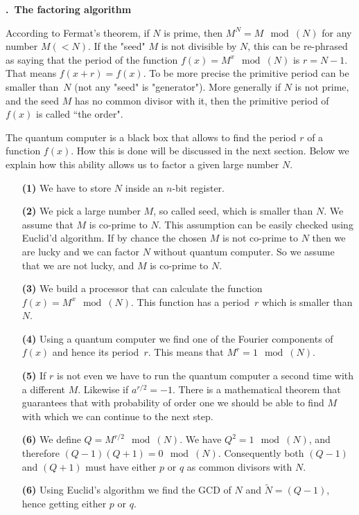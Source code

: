 \documentclass[onecolumn,fleqn, 11pt]{revtex4}
\renewcommand{\thesubsection}{\arabic{subsection}}
\renewcommand{\thesubsubsection}{\arabic{subsubsection}}
\newcommand{\sheadC}[1]
{
\addtocounter{subsubsection}{1}
\vspace{5mm}
{\bf \thesubsection.\thesubsubsection \ #1}  
\nopagebreak
\phantomsection
}
\begin{document}
\sheadC{The factoring algorithm}


According to Fermat's  theorem, if $N$ is prime, 
then $M^N=M \mod(N)$ for any number $M (<N)$.
If the "seed" $M$ is not divisible by $N$, 
this can be re-phrased as saying that the period  
of the function $f(x)=M^x \mod(N)$ is $r=N{-}1$.
That means ${f(x+r)=f(x)}$. 
To be more precise the primitive period can be smaller 
than~$N$ (not any "seed" is "generator"). 
More generally if $N$ is not prime, 
and the seed $M$ has no common divisor with it, 
then the primitive period of $f(x)$ 
is called ``the order".


The quantum computer is a black box that allows 
to find the period $r$ of a function $f(x)$. 
How this is done will be discussed in the 
next section. Below we explain how this ability 
allows us to factor a given large number $N$. 
\begin{itemize}
\item[{\bf (1)}] 
We have to store $N$ inside an $n$-bit register. 
\item[{\bf (2)}] 
We pick a large number $M$, so called seed, which is smaller than $N$. 
We assume that $M$ is co-prime to $N$. This assumption can be 
easily checked using Euclid'd algorithm. If by chance the chosen $M$ is not 
co-prime to $N$ then we are lucky and we can factor $N$ without quantum computer. 
So we assume that we are not lucky, and $M$ is co-prime to $N$.
\item[{\bf (3)}] 
We build a processor that can calculate the function $f(x)=M^x \mod(N)$. 
This function has a period~$r$ which is smaller than $N$. 
\item[{\bf (4)}] 
Using a quantum computer we find one of the Fourier components 
of $f(x)$ and hence its period~$r$. This means that $M^r = 1 \mod(N)$.
\item[{\bf (5)}] 
If $r$ is not even we have to run the quantum computer a second 
time with a different $M$. Likewise if ${a^{r/2}=-1}$. 
There is a mathematical theorem that guarantees 
that with probability of order one we should be able 
to find $M$ with which we can continue to the next step. 
\item[{\bf (6)}] 
We define $Q=M^{r/2} \mod(N)$.  We have $Q^2=1 \mod(N)$, 
and therefore ${(Q-1)(Q+1)=0 \mod(N)}$. 
Consequently both $(Q-1)$ and $(Q+1)$ must have either $p$ or $q$  
as common divisors with $N$. 
\item[{\bf (6)}] 
Using Euclid's algorithm we find the GCD of $N$ and $\tilde{N}=(Q-1)$, 
hence getting either $p$ or $q$.        
\end{itemize}
\end{document}
